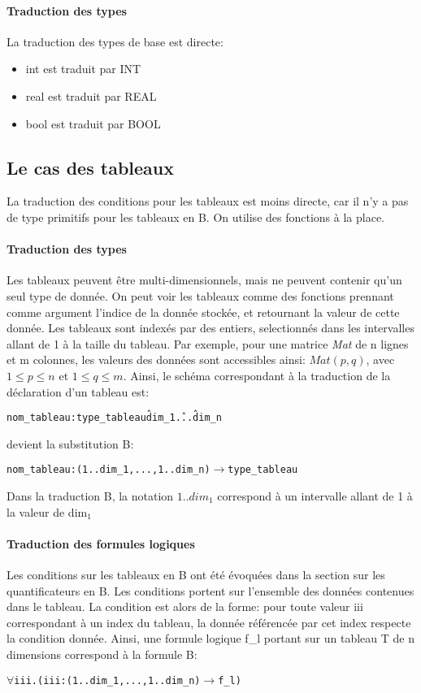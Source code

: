 \paragraph{Traduction des types}
La traduction des types de base est directe:
\begin{itemize}
\item int est traduit par INT
\item real est traduit par REAL
\item bool est traduit par BOOL
\end{itemize}

\subsection{Le cas des tableaux}
La traduction des conditions pour les tableaux est moins directe, car il n'y a
pas de type primitifs pour les tableaux en B. On utilise des fonctions à la
place. 

\paragraph{Traduction des types}
Les tableaux peuvent être multi-dimensionnels, mais ne peuvent contenir qu'un
seul type de donnée. On peut voir les tableaux comme des fonctions prennant
comme argument l'indice de la donnée stockée, et retournant la valeur de cette
donnée. Les tableaux sont indexés par des entiers, selectionnés dans les
intervalles allant de 1 à la taille du tableau.
Par exemple, pour une matrice \emph{Mat} de n lignes et m colonnes, les valeurs
des données sont accessibles ainsi: $Mat(p, q)$, avec $1 \leq p \leq n$ et $1 \leq q
\leq m$.
Ainsi, le schéma correspondant à la traduction de la déclaration d'un tableau
est:
\begin{alltt}
nom\_tableau : type\_tableau \^ dim_1 \^ ... \^ dim_n
\end{alltt}
devient la substitution B:
\begin{alltt}
nom\_tableau : (1..dim_1, ..., 1..dim_n) \(\rightarrow\) type\_tableau 
\end{alltt}
Dans la traduction B, la notation $1..dim_1$ correspond à un
intervalle allant de 1 à la valeur de dim$_1$
\paragraph{Traduction des formules logiques}
Les conditions sur les tableaux en B ont été évoquées dans la section sur les
quantificateurs en B. Les conditions portent sur l'ensemble des données
contenues dans le tableau. La condition est alors de la forme: pour toute valeur
iii correspondant à un index du tableau, la donnée référencée par cet index
respecte la condition donnée. Ainsi, une formule logique f\_l portant sur un
tableau T de n dimensions correspond à la formule B: 
\begin{alltt}
\(\forall \)iii. (iii : (1..dim_1, ..., 1..dim_n) \(\rightarrow\) f\_l)
\end{alltt}

